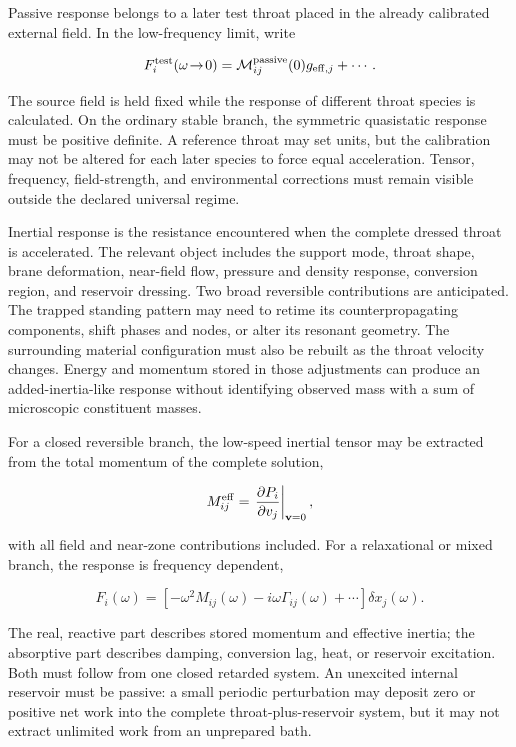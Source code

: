 Passive response belongs to a later test throat placed in the already calibrated
external field. In the low-frequency limit, write

\[
F_i^{\rm test}(\omega\!\to\!0)
=
\mathcal M_{ij}^{\rm passive}(0)
 g_{{\rm eff},j}+\cdots.
\]

The source field is held fixed while the response of different throat species
is calculated. On the ordinary stable branch, the symmetric quasistatic
response must be positive definite. A reference throat may set units, but the
calibration may not be altered for each later species to force equal
acceleration. Tensor, frequency, field-strength, and environmental corrections
must remain visible outside the declared universal regime.

Inertial response is the resistance encountered when the complete dressed
throat is accelerated. The relevant object includes the support mode, throat
shape, brane deformation, near-field flow, pressure and density response,
conversion region, and reservoir dressing. Two broad reversible contributions
are anticipated. The trapped standing pattern may need to retime its
counterpropagating components, shift phases and nodes, or alter its resonant
geometry. The surrounding material configuration must also be rebuilt as the
throat velocity changes. Energy and momentum stored in those adjustments can
produce an added-inertia-like response without identifying observed mass with a
sum of microscopic constituent masses.

For a closed reversible branch, the low-speed inertial tensor may be extracted
from the total momentum of the complete solution,

\[
M_{ij}^{\rm eff}
=
\left.
\frac{\partial P_i}{\partial v_j}
\right|_{\mathbf v=0},
\]

with all field and near-zone contributions included. For a relaxational or
mixed branch, the response is frequency dependent,

\[
F_i(\omega)
=
\left[
-\omega^2M_{ij}(\omega)
-i\omega\Gamma_{ij}(\omega)
+\cdots
\right]
\delta x_j(\omega).
\]

The real, reactive part describes stored momentum and effective inertia; the
absorptive part describes damping, conversion lag, heat, or reservoir
excitation. Both must follow from one closed retarded system. An unexcited
internal reservoir must be passive: a small periodic perturbation may deposit
zero or positive net work into the complete throat-plus-reservoir system, but it
may not extract unlimited work from an unprepared bath.

